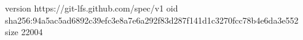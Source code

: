 version https://git-lfs.github.com/spec/v1
oid sha256:94a5ac5ad6892c39efc3e8a7e6a292f83d287f141d1c3270fcc78b4e6da3e552
size 22004
